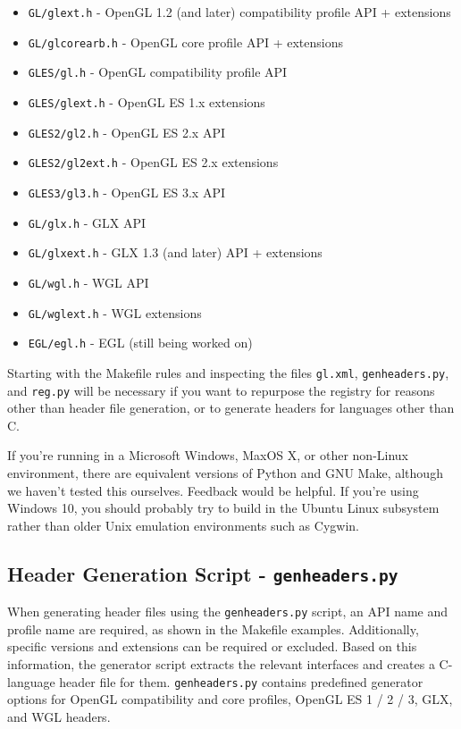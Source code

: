 \documentclass{article}
\def\code#1{{\tt #1}}
\begin{document}
\begin{itemize}
\item \code{GL/glext.h} - OpenGL 1.2 (and later) compatibility profile
      API + extensions
\item \code{GL/glcorearb.h} - OpenGL core profile API + extensions
\item \code{GLES/gl.h} - OpenGL compatibility profile API
\item \code{GLES/glext.h} - OpenGL ES 1.x extensions
\item \code{GLES2/gl2.h} - OpenGL ES 2.x API
\item \code{GLES2/gl2ext.h} - OpenGL ES 2.x extensions
\item \code{GLES3/gl3.h} - OpenGL ES 3.x API
\item \code{GL/glx.h} - GLX API
\item \code{GL/glxext.h} - GLX 1.3 (and later) API + extensions
\item \code{GL/wgl.h} - WGL API
\item \code{GL/wglext.h} - WGL extensions
\item \code{EGL/egl.h} - EGL (still being worked on)
\end{itemize}

Starting with the Makefile rules and inspecting the files \code{gl.xml},
\code{genheaders.py}, and \code{reg.py} will be necessary if you want to
repurpose the registry for reasons other than header file generation, or
to generate headers for languages other than C.

If you're running in a Microsoft Windows, MaxOS X, or other non-Linux
environment, there are equivalent versions of Python and GNU Make, although
we haven't tested this ourselves. Feedback would be helpful. If you're using
Windows 10, you should probably try to build in the Ubuntu Linux subsystem
rather than older Unix emulation environments such as Cygwin.


\subsection{Header Generation Script - \code{genheaders.py}}

When generating header files using the \code{genheaders.py} script, an
API name and profile name are required, as shown in the Makefile
examples. Additionally, specific versions and extensions can be required
or excluded. Based on this information, the generator script extracts
the relevant interfaces and creates a C-language header file for them.
\code{genheaders.py} contains predefined generator options for OpenGL compatibility
and core profiles, OpenGL ES 1 / 2 / 3, GLX, and WGL headers.
\end{document}
